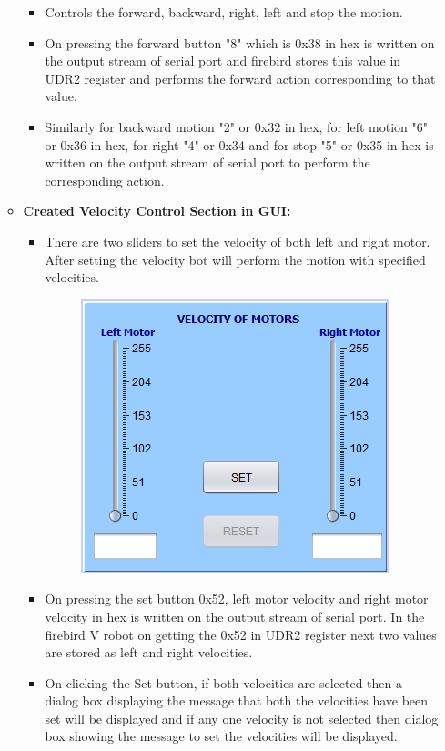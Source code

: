 \documentclass{article}
\begin{document}
\begin{enumerate}
\begin{itemize}
\begin{itemize}
\begin{figure}[h]
\begin{center}
					\end{center}
				\end{figure}
				\item  Controls the forward, backward, right, left and stop the motion.
				\item On pressing the forward button "8" which is 0x38 in hex is written on the output stream of serial port and firebird stores this value in UDR2 register and performs the forward action corresponding to that value. 
				\item Similarly for backward motion "2" or 0x32 in hex, for left motion "6" or 0x36 in hex, for right "4" or 0x34 and for stop "5" or 0x35 in hex is written on the output stream of serial port to perform the corresponding action.
			\end{itemize}  
			\newpage    
			\item \textbf{Created Velocity Control Section in GUI:}
			\begin{itemize}
				\item There are two sliders to set the velocity of both left and right motor. After setting the velocity bot will perform the motion with specified velocities.\\
				\begin{figure}[h]
					\begin{center}
						\includegraphics[scale=1]{velocitycontrol.png}
					\end{center}
				\end{figure}
				\item On pressing the set button 0x52, left motor velocity and right motor velocity in hex is written on the output stream of serial port. In the firebird V robot on getting the 0x52 in UDR2 register next two values are stored as left and right velocities.
				\item On clicking the Set button, if both velocities are selected then a dialog box displaying the message that both the velocities have been set will be displayed and if any one velocity is not selected then dialog box showing the message to set the velocities will be displayed.

\end{itemize}
\end{itemize}
\end{enumerate}
\end{document}

